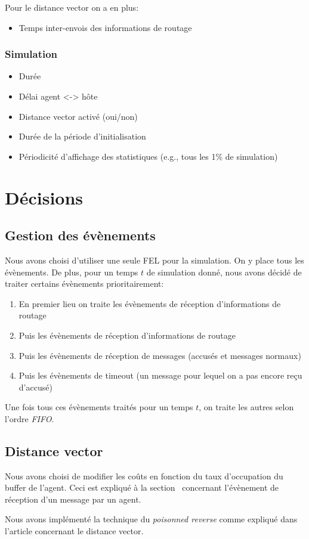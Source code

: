 \documentclass[a4paper,11pt]{article}
\begin{document}
Pour le distance vector on a en plus:
\begin{itemize}
 \item Temps inter-envois des informations de routage
\end{itemize}

\subsubsection{Simulation}
\begin{itemize}
 \item Durée
 \item Délai agent <-> hôte
 \item Distance vector activé (oui/non)
 \item Durée de la période d'initialisation
 \item Périodicité d'affichage des statistiques (e.g., tous les 1\% de simulation)
\end{itemize}



\section{Décisions}

\subsection{Gestion des évènements}
Nous avons choisi d'utiliser une seule FEL pour la simulation. On y place tous les évènements. De plus, pour un temps $t$ de simulation donné, nous avons décidé de traiter certains évènements prioritairement:

\begin{enumerate}
 \item En premier lieu on traite les évènements de réception d'informations de routage
 \item Puis les évènements de réception d'informations de routage
 \item Puis les évènements de réception de messages (accusés et messages normaux)
 \item Puis les évènements de timeout (un message pour lequel on a pas encore reçu d'accusé)
\end{enumerate}

Une fois tous ces évènements traités pour un temps $t$, on traite les autres selon l'ordre \textit{FIFO}.

\subsection{Distance vector}
Nous avons choisi de modifier les coûts en fonction du taux d'occupation du buffer de l'agent. Ceci est expliqué à la section \ concernant l'évènement de réception d'un message par un agent.

Nous avons implémenté la technique du \textit{poisonned reverse} comme expliqué dans l'article concernant le distance vector.




\clearpage


\appendix
\end{document}
